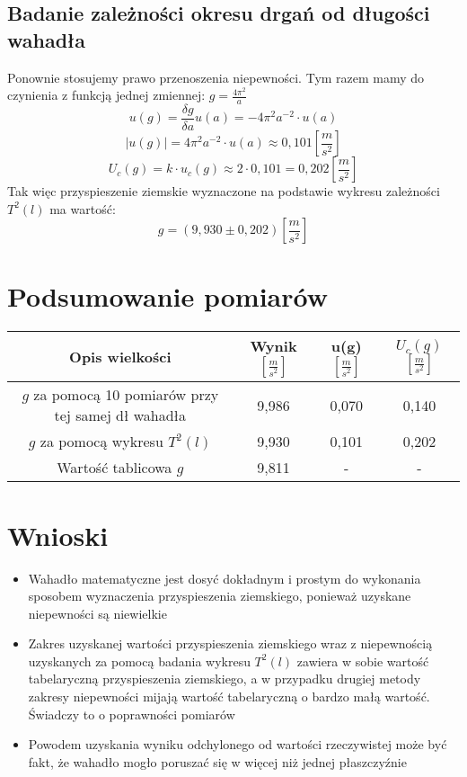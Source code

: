 \documentclass [a4paper,11pt]{article}
\begin{document}
\subsection{Badanie zależności okresu drgań od długości wahadła}
Ponownie stosujemy prawo przenoszenia niepewności. Tym razem mamy do czynienia z funkcją jednej zmiennej:  $g= \frac{4 \pi^2}{a}$
$$ u(g) = \frac{\delta g}{\delta a} u(a) =  - 4 \pi^2 a^{-2} \cdot u(a)$$
$$ |u(g)| =  4 \pi^2 a^{-2} \cdot u(a) \approx 0,101  \left[ \frac{m}{s^2}\right] $$
$$U_c(g) = k \cdot u_c(g) \approx 2 \cdot 0,101 = 0,202 \left[ \frac{m}{s^2} \right] $$
Tak więc przyspieszenie ziemskie wyznaczone na podstawie wykresu zależności $T^2(l)$ ma wartość:
$$g = (9,930 \pm 0,202)\left[ \frac{m}{s^2} \right] $$

\section{Podsumowanie pomiarów}
\begin{tabular}{|c|c|c|c|}
\hline Opis wielkości & Wynik $\left[ \frac{m}{s^2} \right]$ & u(g) $\left[ \frac{m}{s^2} \right]$ & $U_c(g)$ $\left[ \frac{m}{s^2} \right]$ \\
\hline $g$ za pomocą 10 pomiarów przy tej samej dł wahadła  & 9,986 & 0,070  & 0,140  \\ 
\hline $g$ za pomocą wykresu $T^2(l)$ & 9,930  & 0,101  & 0,202  \\ 
\hline Wartość tablicowa $g$ & 9,811  & -  & -  \\ 
\hline 
\end{tabular} 



\section{Wnioski}
\begin{itemize}
\item Wahadło matematyczne jest dosyć dokładnym i prostym do wykonania sposobem wyznaczenia przyspieszenia ziemskiego, ponieważ uzyskane niepewności są niewielkie
\item Zakres uzyskanej wartości przyspieszenia ziemskiego wraz z niepewnością uzyskanych za pomocą badania wykresu $T^2(l)$ zawiera w sobie wartość tabelaryczną przyspieszenia ziemskiego, a w przypadku drugiej metody zakresy niepewności mijają wartość tabelaryczną o bardzo małą wartość. Świadczy to o poprawności pomiarów
\item Powodem uzyskania wyniku odchylonego od wartości rzeczywistej może być fakt, że wahadło mogło poruszać się w więcej niż jednej płaszczyźnie

 
\end{itemize}
\end{document}

